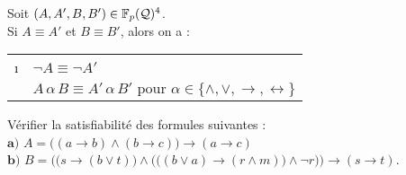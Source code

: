 			\colsep{1.5pt}
			\eqskip{0mm}
			\begin{Proprietes}
				Soit \((A,A',B,B') \in \mathbb{F}_p(\mathcal{Q})^4\). \\
				Si \(A \equiv A'\) et \(B \equiv B'\), alors on a :
					\!\begin{tabular}[t]{cl}
						\i & \(\neg A \equiv \neg A'\) \\
						\ii & \(A \,\alpha\, B \equiv A' \,\alpha\, B' \text{ pour } \alpha \in \{\wedge,\vee,\rightarrow,\leftrightarrow\}\)
					\end{tabular}
			\end{Proprietes}
			
			\begin{Exercice}
				Vérifier la satisfiabilité des formules suivantes : \\
				\hspace*{5mm} \bdot \(\bm{a)}\) \(A = \big((a \rightarrow b) \wedge (b \rightarrow c)\big) \rightarrow (a \rightarrow c)\) \\
				\hspace*{5mm} \bdot \(\bm{b)}\) \(B = \Big(\!\big(s \rightarrow (b \vee t)\big) \wedge \Big(\!\big((b \vee a) \rightarrow (r \wedge m)\big) \wedge \neg r\Big)\!\Big) \rightarrow (s \rightarrow t)\).
			\end{Exercice}
			
			\begin{Correction}
			\end{Correction}
